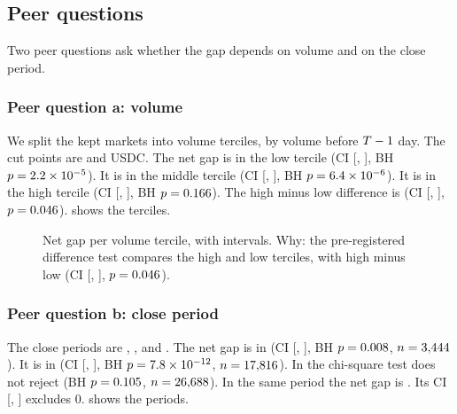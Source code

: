 \subsection{Peer questions}\label{sec:app-peer}
Two peer questions ask whether the gap depends on volume and on the close period.
\subsubsection{Peer question a: volume}\label{sec:app-peer-a}
We split the kept markets into volume terciles, by volume before $T-1$ day.
The cut points are \RThreePeerACutLowMid{} and \RThreePeerACutMidHigh{} USDC.
The net gap is \RThreePeerALowNetGap{} in the low tercile (CI [\RThreePeerALowNetGapCiLow, \RThreePeerALowNetGapCiHigh], BH $p=2.2\times10^{-5}$).
It is \RThreePeerAMidNetGap{} in the middle tercile (CI [\RThreePeerAMidNetGapCiLow, \RThreePeerAMidNetGapCiHigh], BH $p=6.4\times10^{-6}$).
It is \RThreePeerAHighNetGap{} in the high tercile (CI [\RThreePeerAHighNetGapCiLow, \RThreePeerAHighNetGapCiHigh], BH $p=0.166$).
The high minus low difference is \RThreePeerADiff{} (CI [\RThreePeerADiffCiLow, \RThreePeerADiffCiHigh], $p=0.046$).
 shows the terciles.

\begin{figure}[H]
\centering
{}
\caption{Net gap per volume tercile, with \CiLevel{} intervals. Why: the pre-registered difference test compares the high and low terciles, with high minus low \RThreePeerADiff{} (CI [\RThreePeerADiffCiLow, \RThreePeerADiffCiHigh], $p=0.046$).}%
\label{fig:r3-peer-a}
\end{figure}

\subsubsection{Peer question b: close period}\label{sec:app-peer-b}
The close periods are \RThreePeerBPeriodOneLabel, \RThreePeerBPeriodTwoLabel, and \RThreePeerBPeriodThreeLabel.
The net gap is \RThreePeerBPeriodOneNetGap{} in \RThreePeerBPeriodOneLabel{} (CI [\RThreePeerBPeriodOneNetGapCiLow, \RThreePeerBPeriodOneNetGapCiHigh], BH $p=0.008$, $n=3{,}444$).
It is \RThreePeerBPeriodTwoNetGap{} in \RThreePeerBPeriodTwoLabel{} (CI [\RThreePeerBPeriodTwoNetGapCiLow, \RThreePeerBPeriodTwoNetGapCiHigh], BH $p=7.8\times10^{-12}$, $n=17{,}816$).
In \RThreePeerBPeriodThreeLabel{} the chi-square test does not reject (BH $p=0.105$, $n=26{,}688$).
In the same period the net gap is \RThreePeerBPeriodThreeNetGap.
Its \CiLevel{} CI [\RThreePeerBPeriodThreeNetGapCiLow, \RThreePeerBPeriodThreeNetGapCiHigh] excludes 0.
 shows the periods.

